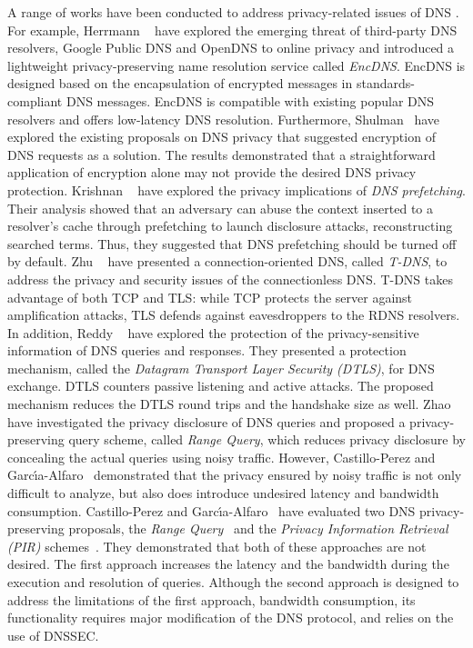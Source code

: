 \label{sec:Privacy}
A range of works have been conducted to address privacy-related issues of DNS . For example, Herrmann \etal~ have explored the emerging threat of third-party DNS resolvers, \eg  Google Public DNS and OpenDNS to online privacy and introduced a lightweight privacy-preserving name resolution service called \textit{EncDNS}. EncDNS is designed based on the encapsulation of encrypted messages in standards-compliant DNS messages. EncDNS is compatible with existing popular DNS resolvers and offers low-latency DNS resolution.    
Furthermore, Shulman~ have explored the existing proposals on DNS privacy that suggested encryption of DNS requests as a solution. The results demonstrated that a straightforward application of encryption alone may not provide the desired DNS privacy protection. 
Krishnan \etal~ have explored the privacy implications of \textit{DNS prefetching}. Their analysis showed that an adversary can abuse the context inserted to a resolver's cache through prefetching to launch disclosure attacks, \eg reconstructing searched terms. Thus, they suggested that DNS prefetching should be turned off by default.
Zhu \etal~ have presented a connection-oriented DNS, called \textit{T-DNS}, to address the privacy and security issues of the connectionless DNS. T-DNS takes advantage of both TCP and TLS: while TCP protects the server against amplification attacks, TLS defends against eavesdroppers to the RDNS resolvers.
In addition, Reddy \etal~ have explored the protection of the privacy-sensitive information of DNS queries and responses. They presented a protection mechanism, called the \textit{Datagram Transport Layer Security (DTLS)}, for DNS exchange. DTLS counters passive listening and active attacks. The proposed mechanism reduces the DTLS round trips and the handshake size as well.
Zhao \etal~ have investigated the privacy disclosure of DNS queries and proposed a privacy-preserving query scheme, called \textit{Range Query}, which reduces privacy disclosure by concealing the actual queries using noisy traffic. However, Castillo-Perez and Garc{\'{\i}}a{-}Alfaro~ demonstrated that the privacy ensured by noisy traffic is not only difficult to analyze, but also does introduce undesired latency and bandwidth consumption. Castillo-Perez and Garc{\'{\i}}a{-}Alfaro~ have evaluated two DNS privacy-preserving proposals, the \textit{Range Query}~ and the \textit{Privacy Information Retrieval (PIR)} schemes~. They demonstrated that both of these approaches are not desired. The first approach increases the latency and the bandwidth  during the execution and resolution of queries. Although the second approach is designed to address the limitations of the first approach, \eg bandwidth consumption, its functionality requires major modification of the DNS protocol, and relies on the use of DNSSEC.
